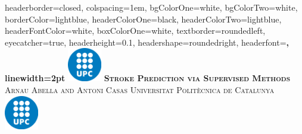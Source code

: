 \documentclass[landscape,a0paper,fontscale=0.285]{baposter} %
\begin{document}
\begin{poster}
{
headerborder=closed, %
colspacing=1em, %
bgColorOne=white, %
bgColorTwo=white, %
borderColor=lightblue, %
headerColorOne=black, %
headerColorTwo=lightblue, %
headerFontColor=white, %
boxColorOne=white, %
textborder=roundedleft, %
eyecatcher=true, %
headerheight=0.1\textheight, %
headershape=roundedright, %
headerfont=\Large\bf\textsc, %
linewidth=2pt %
}
%
{\includegraphics[height=4em]{upc.png}} %
{\bf\textsc{Stroke Prediction via Supervised Methods}\vspace{0.5em}}
{\textsc{Arnau Abella and Antoni Casas \hspace{12pt} Universitat Polit\`ecnica de Catalunya}}
{\includegraphics[height=4em]{upc.png}} %



\end{poster}
\end{document}
